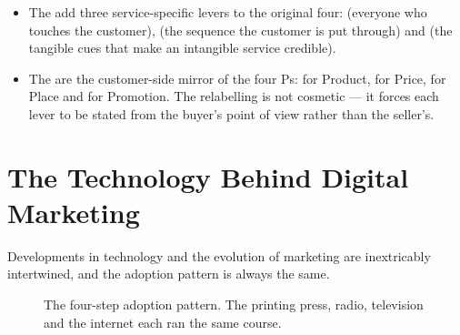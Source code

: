 \documentclass{MMTextbook}
\begin{document}
\begin{itemize}
\item The  add three service-specific
      levers to the original four:  (everyone who touches the
      customer),  (the sequence the customer is put through) and
       (the tangible cues that make an intangible
      service credible).
\item The  are the customer-side mirror of the four Ps:
       for Product,  for Price,
       for Place and  for Promotion. The
      relabelling is not cosmetic --- it forces each lever to be stated from
      the buyer's point of view rather than the seller's.
\end{itemize}

\section{The Technology Behind Digital Marketing}

Developments in technology and the evolution of marketing are inextricably
intertwined, and the adoption pattern is always the same.

\begin{figure}[htbp]
\centering
{}
\caption[The technology adoption pattern]%
        {The four-step adoption pattern. The printing press, radio, television
         and the internet each ran the same course.}
\label{fig:adoption}
\end{figure}
\end{document}
